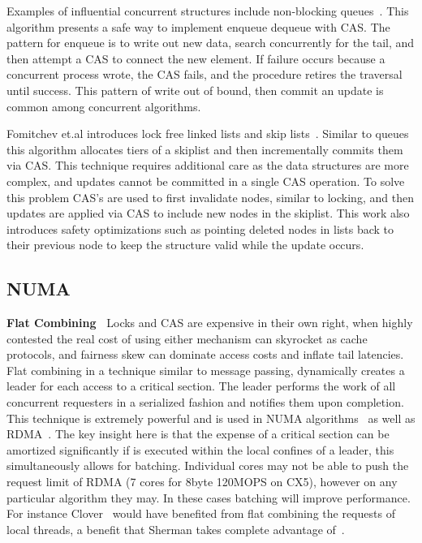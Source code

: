 Examples of influential concurrent structures include non-blocking
queues~\cite{simple-fast}. This algorithm presents a safe way to implement
enqueue dequeue with CAS. The pattern for enqueue is to write out new data,
search concurrently for the tail, and then attempt a CAS to connect the new
element. If failure occurs because a concurrent process wrote, the CAS fails,
and the procedure retires the traversal until success. This pattern of write out
of bound, then commit an update is common among concurrent algorithms.

Fomitchev et.al introduces lock free linked lists and skip
lists~\cite{lock-free-skip}. Similar to queues this algorithm allocates tiers of
a skiplist and then incrementally commits them via CAS. This technique requires
additional care as the data structures are more complex, and updates cannot be
committed in a single CAS operation. To solve this problem CAS's are used to
first invalidate nodes, similar to locking, and then updates are applied via CAS
to include new nodes in the skiplist. This work also introduces safety
optimizations such as pointing deleted nodes in lists back to their previous
node to keep the structure valid while the update occurs.


\subsection{NUMA}

\textbf{Flat Combining~\cite{flat-combine}} Locks and CAS are expensive in their
own right, when highly contested the real cost of using either mechanism can
skyrocket as cache protocols, and fairness skew can dominate access costs and
inflate tail latencies. Flat combining in a technique similar to message
passing, dynamically creates a leader for each access to a critical section. The
leader performs the work of all concurrent requesters in a serialized fashion
and notifies them upon completion. This technique is extremely powerful and is
used in NUMA algorithms~\cite{black-box-numa} as well as RDMA~\cite{flock}. The
key insight here is that the expense of a critical section can be amortized
significantly if is executed within the local confines of a leader, this
simultaneously allows for batching. Individual cores may not be able to push the
request limit of RDMA (7 cores for 8byte 120MOPS on CX5), however on
any particular algorithm they may. In these cases batching will improve
performance. For instance Clover~\cite{clover} would have benefited from flat
combining the requests of local threads, a benefit that Sherman takes complete
advantage of~\cite{sherman}.


